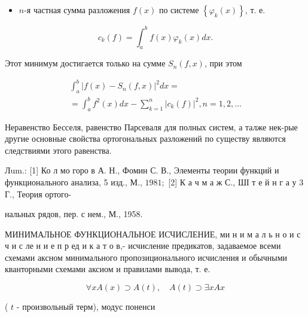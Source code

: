 \documentclass[10pt]{article}
\begin{document}
\begin{itemize}

  \item $n$-я частная сумма разложения $f(x)$ по системе $\left\{\varphi_{k}(x)\right\}$, т. е.

\end{itemize}



\[

c_{k}(f)=\int_{a}^{b} f(x) \varphi_{k}(x) d x .

\]



Этот минимум достигается только на сумме $S_{n}(f, x)$, при этом



\[

\begin{gathered}

\int_{a}^{b}\left|f(x)-S_{n}(f, x)\right|^{2} d x= \\

=\int_{a}^{b} f^{2}(x) d x-\sum_{k=1}^{n}\left|c_{k}(f)\right|^{2}, n=1,2, \ldots

\end{gathered}

\]



Неравенство Бесселя, равенство Парсеваля для полных систем, а талже нек-рые другие основные свойства ортогональных разложений по существу являются следствиями этого равенства.



Лum.: [1] Ко л мо горо в А. Н., Фомин С. В., Элементы теории функций и функционального анализа, 5 изд., М., $1981 ;$ [2] К а ч м а ж С., ШІ т е й н г а у 3 Г., Теория ортого-

нальных рядов, пер. с нем., М., 1958.



МИНИМАЛЬНОЕ ФУНКЦИОНАЛЬНОЕ ИСЧИСЛЕНИЕ, ми н и м а л ь н о и с ч и с ле н и е п р ед и к а т о в,- исчисление предикатов, задаваемое всеми схемами аксном минимального пропозиционального исчисления и обычными кванторными схемами аксиом и правилами вывода, т. е.



\[

\forall x A(x) \supset A(t), \quad A(t) \supset \exists x A x

\]



( $t$ - произвольный терм), модус поненси
\end{document}
